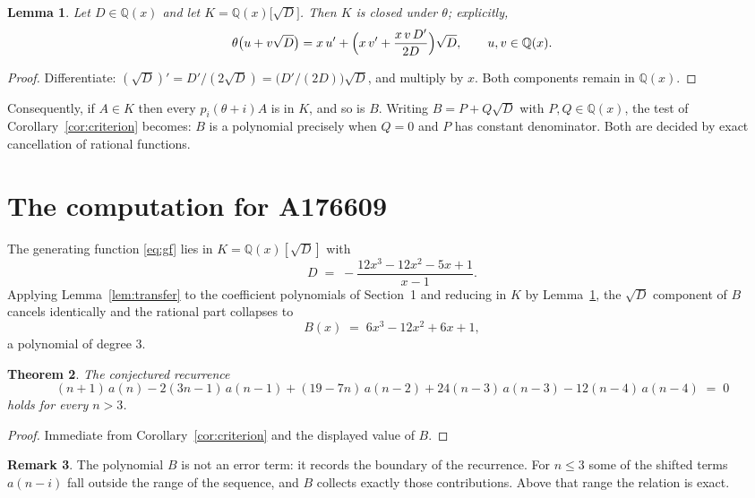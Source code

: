 \documentclass[11pt,a4paper]{article}
\theoremstyle{plain}
\newtheorem{theorem}{Theorem}
\newtheorem{lemma}[theorem]{Lemma}
\theoremstyle{definition}
\newtheorem{remark}[theorem]{Remark}
\begin{document}
\begin{lemma}\label{lem:field}
Let $D\in\mathbb{Q}(x)$ and let $K=\mathbb{Q}(x)\bigl[\sqrt{D}\bigr]$. Then $K$ is closed
under $\theta$; explicitly,
\[
\theta\bigl(u+v\sqrt{D}\bigr)=x\,u'+\Bigl(x\,v'+\frac{x\,v\,D'}{2D}\Bigr)\sqrt{D},
\qquad u,v\in\mathbb{Q}(x).
\]
\end{lemma}

\begin{proof}
Differentiate: $(\sqrt{D})'=D'/(2\sqrt{D})=\bigl(D'/(2D)\bigr)\sqrt{D}$, and multiply by
$x$. Both components remain in $\mathbb{Q}(x)$.
\end{proof}

Consequently, if $A\in K$ then every $p_{i}(\theta+i)A$ is in $K$, and so is $B$. Writing
$B=P+Q\sqrt{D}$ with $P,Q\in\mathbb{Q}(x)$, the test of Corollary~\ref{cor:criterion}
becomes: $B$ is a polynomial precisely when $Q=0$ and $P$ has constant denominator. Both
are decided by exact cancellation of rational functions.

\section{The computation for A176609}

The generating function \eqref{eq:gf} lies in $K=\mathbb{Q}(x)[\sqrt{D}]$ with
\[
D \;=\; - \frac{12 x^{3} - 12 x^{2} - 5 x + 1}{x - 1} .
\]
Applying Lemma~\ref{lem:transfer} to the coefficient polynomials of Section~1 and reducing
in $K$ by Lemma~\ref{lem:field}, the $\sqrt{D}$ component of $B$ cancels identically and
the rational part collapses to
\[
B(x)\;=\;6 x^{3} - 12 x^{2} + 6 x + 1 ,
\]
a polynomial of degree $3$.

\begin{theorem}
The conjectured recurrence
\[
(n + 1)\,a(n) -  2 \left(3 n - 1\right)\,a(n-1) + (19 - 7 n)\,a(n-2) + 24 \left(n - 3\right)\,a(n-3) -  12 \left(n - 4\right)\,a(n-4) \;=\;0
\]
holds for every $n>3$.
\end{theorem}

\begin{proof}
Immediate from Corollary~\ref{cor:criterion} and the displayed value of $B$.
\end{proof}

\begin{remark}
The polynomial $B$ is not an error term: it records the boundary of the recurrence. For
$n\le3$ some of the shifted terms $a(n-i)$ fall outside the range of the sequence,
and $B$ collects exactly those contributions. Above that range the relation is exact.
\end{remark}
\end{document}
